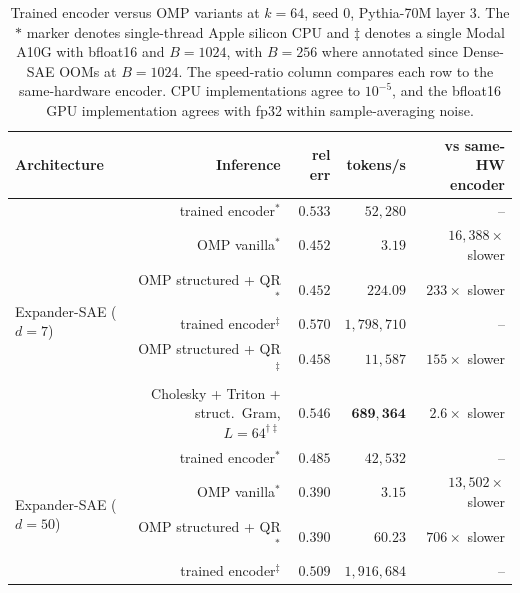 \documentclass{article}
\theoremstyle{plain}
\theoremstyle{definition}
\theoremstyle{remark}
\begin{document}
\begin{table}[!htbp]
    \centering
    \caption{Trained encoder versus OMP variants at $k{=}64$, seed 0, Pythia-70M layer 3. The $*$ marker denotes single-thread Apple silicon CPU and $\ddagger$ denotes a single Modal A10G with bfloat16 and $B{=}1024$, with $B{=}256$ where annotated since Dense-SAE OOMs at $B{=}1024$. The speed-ratio column compares each row to the same-hardware encoder. CPU implementations agree to $10^{-5}$, and the bfloat16 GPU implementation agrees with fp32 within sample-averaging noise.}
    \label{tab:enc_vs_omp}
    \small
    \begin{tabular}{lrrrr}
        \toprule
        Architecture & Inference & rel err & tokens/s & vs same-HW encoder \\
        \midrule
        \multirow{6}{*}{Expander-SAE ($d{=}7$)}   & trained encoder$^*$                       & $0.533$ & $52{,}280$    & --                       \\
                                                  & OMP vanilla$^*$                           & $0.452$ & $3.19$        & $16{,}388\times$ slower  \\
                                                  & OMP structured + QR$^*$                   & $0.452$ & $224.09$      & $233\times$ slower       \\
                                                  & trained encoder$^\ddagger$                & $0.570$ & $1{,}798{,}710$ & --                     \\
                                                  & OMP structured + QR$^\ddagger$            & $0.458$ & $11{,}587$ & $155\times$ slower \\
                                                  & Cholesky + Triton + struct.\ Gram, $L{=}64^{\dagger\ddagger}$ & $0.546$ & $\mathbf{689{,}364}$ & $\mathbf{2.6\times}$ slower \\
        \midrule
        \multirow{8}{*}{Expander-SAE ($d{=}50$)}  & trained encoder$^*$                       & $0.485$ & $42{,}532$    & --                       \\
                                                  & OMP vanilla$^*$                           & $0.390$ & $3.15$        & $13{,}502\times$ slower  \\
                                                  & OMP structured + QR$^*$                   & $0.390$ & $60.23$       & $706\times$ slower       \\
                                                  & trained encoder$^\ddagger$                & $0.509$ & $1{,}916{,}684$ & --                     \\

\end{tabular}
\end{table}
\end{document}
